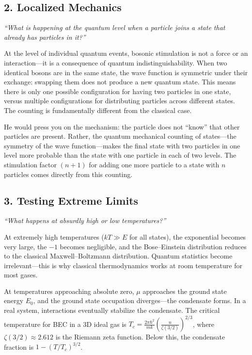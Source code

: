 \subsection*{2. Localized Mechanics}
\textit{``What is happening at the quantum level when a particle joins a state that already has particles in it?''}

At the level of individual quantum events, bosonic stimulation is not a force or an interaction---it is a consequence of quantum indistinguishability. When two identical bosons are in the same state, the wave function is symmetric under their exchange: swapping them does not produce a new quantum state. This means there is only one possible configuration for having two particles in one state, versus multiple configurations for distributing particles across different states. The counting is fundamentally different from the classical case.

He would press you on the mechanism: the particle does not ``know'' that other particles are present. Rather, the quantum mechanical counting of states---the symmetry of the wave function---makes the final state with two particles in one level more probable than the state with one particle in each of two levels. The stimulation factor $(n+1)$ for adding one more particle to a state with $n$ particles comes directly from this counting.

\subsection*{3. Testing Extreme Limits}
\textit{``What happens at absurdly high or low temperatures?''}

At extremely high temperatures ($kT \gg E$ for all states), the exponential becomes very large, the $-1$ becomes negligible, and the Bose--Einstein distribution reduces to the classical Maxwell--Boltzmann distribution. Quantum statistics become irrelevant---this is why classical thermodynamics works at room temperature for most gases.

At temperatures approaching absolute zero, $\mu$ approaches the ground state energy $E_0$, and the ground state occupation diverges---the condensate forms. In a real system, interactions eventually stabilize the condensate. The critical temperature for BEC in a 3D ideal gas is $T_c = \frac{2\pi\hbar^2}{mk}\left(\frac{n}{\zeta(3/2)}\right)^{2/3}$, where $\zeta(3/2) \approx 2.612$ is the Riemann zeta function. Below this, the condensate fraction is $1 - (T/T_c)^{3/2}$.

